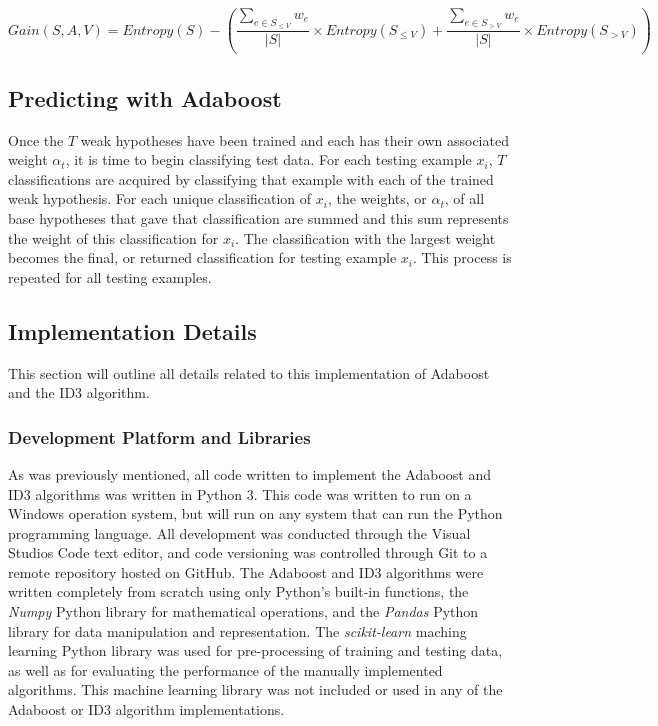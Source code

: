 \documentclass[a4paper]{article}
\begin{document}
\begin{equation}
    \label{eq:weighted-info-gain}
    Gain(S, A, V) = Entropy(S) - \left(\frac{\sum_{e \in S_{\le V}}w_e}{|S|}\times Entropy(S_{\le V}) + \frac{\sum_{e \in S_{> V}}w_e}{|S|}\times Entropy(S_{> V}) \right)
\end{equation}

\subsection{Predicting with Adaboost}
Once the $T$ weak hypotheses have been trained and each has their own associated weight $\alpha_t$, it is time to begin classifying test data. For each testing example $x_i$, $T$ classifications are acquired by classifying that example with each of the trained weak hypothesis. For each unique classification of $x_i$, the weights, or $\alpha_t$, of all base hypotheses that gave that classification are summed and this sum represents the weight of this classification for $x_i$. The classification with the largest weight becomes the final, or returned classification for testing example $x_i$. This process is repeated for all testing examples.

\subsection{Implementation Details}
This section will outline all details related to this implementation of Adaboost and the ID3 algorithm.

\subsubsection{Development Platform and Libraries}
As was previously mentioned, all code written to implement the Adaboost and ID3 algorithms was written in Python 3. This code was written to run on a Windows operation system, but will run on any system that can run the Python programming language. All development was conducted through the Visual Studios Code text editor, and code versioning was controlled through Git to a remote repository hosted on GitHub. The Adaboost and ID3 algorithms were written completely from scratch using only Python's built-in functions, the \textit{Numpy} Python library for mathematical operations, and the \textit{Pandas} Python library for data manipulation and representation. The \textit{scikit-learn} maching learning Python library was used for pre-processing of training and testing data, as well as for evaluating the performance of the manually implemented algorithms. This machine learning library was not included or used in any of the Adaboost or ID3 algorithm implementations.
\end{document}
